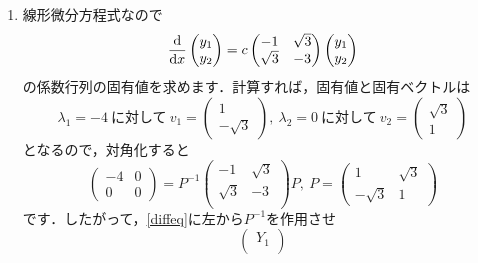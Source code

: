 \documentclass[a4paper,pdflatex,ja=standard]{bxjsarticle}
\begin{document}
\begin{enumerate}
  \item 

  線形微分方程式なので
  \begin{equation}
    \dv{}{x}
    \begin{pmatrix}
      y_1 \\
      y_2
    \end{pmatrix}
    =
    c
    \begin{pmatrix}
      -1 & \sqrt{3} \\
      \sqrt{3}  & -3  \\
    \end{pmatrix}
    \begin{pmatrix}
      y_1 \\
      y_2
    \end{pmatrix}
    \label{diffeq}
  \end{equation}
  の係数行列の固有値を求めます．計算すれば，固有値と固有ベクトルは
  \begin{equation}
    \lambda_1=-4\ 
    \text{に対して}\ 
    v_1
    =
    \begin{pmatrix}
      1 \\
      -\sqrt{3} 
    \end{pmatrix}
    ,\ 
    \lambda_2=0\ 
    \text{に対して}\ 
    v_2
    =
    \begin{pmatrix}
      \sqrt{3} \\
      1 
    \end{pmatrix}
  \end{equation}
  となるので，対角化すると
  \begin{equation}
    \begin{pmatrix}
      -4 & 0 \\
      0 & 0
    \end{pmatrix}
    =
    P^{-1}
    \begin{pmatrix}
      -1 & \sqrt{3} \\
      \sqrt{3}  & -3  \\
    \end{pmatrix}
    P
    ,\ 
    P
    =
    \begin{pmatrix}
      1 & \sqrt{3} \\
      -\sqrt{3} & 1
    \end{pmatrix}
  \end{equation}
  です．したがって，\eqref{diffeq}に左から$P^{-1}$を作用させ
  \begin{equation}
    \begin{pmatrix}
      Y_1 \\

\end{pmatrix}
\end{equation}
\end{enumerate}
\end{document}
